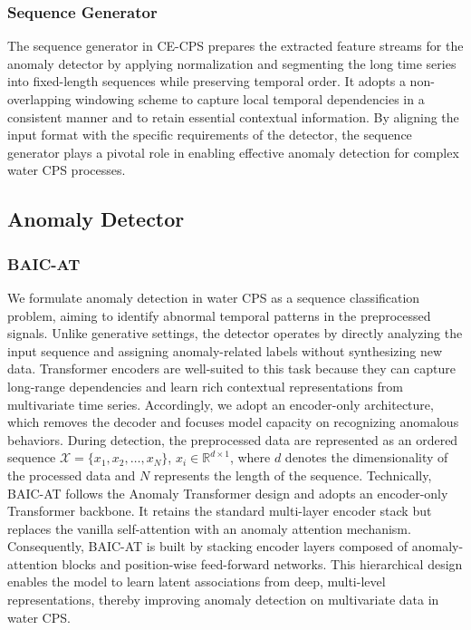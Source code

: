 \documentclass[pdflatex,sn-mathphys-num]{sn-jnl}%
\theoremstyle{thmstyleone}
\theoremstyle{thmstyletwo}%
\theoremstyle{thmstylethree}%
\begin{document}
\subsubsection{Sequence Generator}
The sequence generator in CE-CPS prepares the extracted feature streams for the anomaly detector by applying normalization and segmenting the long time series into fixed-length sequences while preserving temporal order. It adopts a non-overlapping windowing scheme to capture local temporal dependencies in a consistent manner and to retain essential contextual information.
By aligning the input format with the specific requirements of the detector, the sequence generator plays a pivotal role in enabling effective anomaly detection for complex water CPS processes.

\subsection{Anomaly Detector}
\subsubsection{BAIC-AT}
We formulate anomaly detection in water CPS as a sequence classification problem, aiming to identify abnormal temporal patterns in the preprocessed signals. Unlike generative settings, the detector operates by directly analyzing the input sequence and assigning anomaly-related labels without synthesizing new data. Transformer encoders are well-suited to this task because they can capture long-range dependencies and learn rich contextual representations from multivariate time series. Accordingly, we adopt an encoder-only architecture, which removes the decoder and focuses model capacity on recognizing anomalous behaviors. During detection, the preprocessed data are represented as an ordered sequence $\mathcal{X}=\{x_1,x_2,\ldots,x_N\}$, $x_i\in \mathbb{R}^{d \times 1}$, where $d$ denotes the dimensionality of the processed data and $N$ represents the length of the sequence. Technically, BAIC-AT follows the Anomaly Transformer design and adopts an encoder-only Transformer backbone. It retains the standard multi-layer encoder stack but replaces the vanilla self-attention with an anomaly attention mechanism. Consequently, BAIC-AT is built by stacking encoder layers composed of anomaly-attention blocks and position-wise feed-forward networks. This hierarchical design enables the model to learn latent associations from deep, multi-level representations, thereby improving anomaly detection on multivariate data in water CPS.
\end{document}
